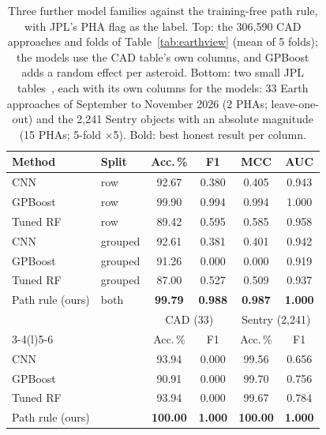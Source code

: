 \begin{table}[t]
\centering
\footnotesize
\caption{Three further model families against the training-free path rule, with JPL's PHA flag as the label. Top: the 306,590 CAD approaches and folds of Table~\ref{tab:earthview} (mean of 5 folds); the models use the CAD table's own columns, and GPBoost adds a random effect per asteroid. Bottom: two small JPL tables~\cite{jpl_cad_api,jpl_sentry_api}, each with its own columns for the models: 33 Earth approaches of September to November 2026 (2 PHAs; leave-one-out) and the 2,241 Sentry objects with an absolute magnitude (15 PHAs; 5-fold $\times$5). Bold: best honest result per column.}
\label{tab:sheet}
\setlength{\tabcolsep}{2.2pt}
\begin{tabular}{@{}llcccc@{}}
\toprule
Method & Split & Acc.\,\% & F1 & MCC & AUC \\
\midrule
CNN & row & 92.67 & 0.380 & 0.405 & 0.943 \\
GPBoost & row & 99.90 & 0.994 & 0.994 & 1.000 \\
Tuned RF & row & 89.42 & 0.595 & 0.585 & 0.958 \\
CNN & grouped & 92.61 & 0.381 & 0.401 & 0.942 \\
GPBoost & grouped & 91.26 & 0.000 & 0.000 & 0.919 \\
Tuned RF & grouped & 87.00 & 0.527 & 0.509 & 0.937 \\
Path rule (ours) & both & \textbf{99.79} & \textbf{0.988} & \textbf{0.987} & \textbf{1.000} \\
\midrule
 & & \multicolumn{2}{c}{CAD (33)} & \multicolumn{2}{c}{Sentry (2,241)} \\
\cmidrule(lr){3-4}\cmidrule(l){5-6}
 & & Acc.\,\% & F1 & Acc.\,\% & F1 \\
CNN & & 93.94 & 0.000 & 99.56 & 0.656 \\
GPBoost & & 90.91 & 0.000 & 99.70 & 0.756 \\
Tuned RF & & 93.94 & 0.000 & 99.67 & 0.784 \\
Path rule (ours) & & \textbf{100.00} & \textbf{1.000} & \textbf{100.00} & \textbf{1.000} \\
\bottomrule
\end{tabular}
\end{table}
